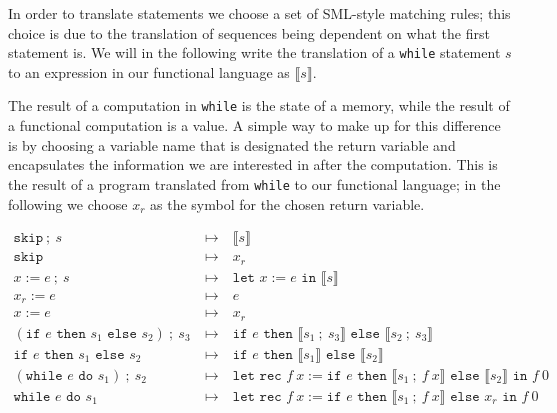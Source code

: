 \documentclass[11pt, leqno]{article}
\theoremstyle{definition}
\begin{document}
In order to translate statements we choose a set of SML-style matching rules; this
choice is due to the translation of sequences being dependent on what the first
statement is. We will in the following write the translation of a \texttt{while}
statement $s$ to an expression in our functional language as $\llbracket s
\rrbracket$. 

The result of a computation in \texttt{while} is the state of a memory, while the
result of a functional computation is a value. A simple way to make up for this
difference is by choosing a variable name that is designated the return variable and
encapsulates the information we are interested in after the computation. This is the
result of a program translated from \texttt{while} to our functional language; in the
following we choose $x_r$ as the symbol for the chosen return variable. 

\begin{align}
  \label{eq:transwhile}
  \texttt{skip}~;~s & ~\mapsto~ & \llbracket s \rrbracket\\
  \texttt{skip}     & ~\mapsto~ & x_r\\
  x := e~;~s        & ~\mapsto~ & \texttt{let } x := e \texttt{ in }\llbracket s \rrbracket\\
  x_r := e          & ~\mapsto~ & e \\
  x := e            & ~\mapsto~ & x_r \\
  (\texttt{if } e \texttt{ then } s_1 \texttt{ else } s_2) ~;~s_3
                    & ~\mapsto~ & \texttt{if } e
                                  \texttt{ then } \llbracket s_1 ~;~ s_3 \rrbracket
                                  \texttt{ else } \llbracket s_2 ~;~ s_3 \rrbracket \\
  \texttt{if } e \texttt{ then } s_1 \texttt{ else } s_2
                    & ~\mapsto~ & \texttt{if } e
                                  \texttt{ then } \llbracket s_1 \rrbracket
                                  \texttt{ else } \llbracket s_2 \rrbracket \\
  (\texttt{while } e \texttt{ do } s_1) ~;~ s_2
                    & ~\mapsto~ & \texttt{let rec } f~x :=
                                  \texttt{if } e
                                  \texttt{ then } \llbracket s_1 ~;~ f~x \rrbracket
                                  \texttt{ else } \llbracket s_2 \rrbracket \label{eq:while1}
                                  \texttt{ in } f~0\\
  \texttt{while } e \texttt{ do } s_1
                    & ~\mapsto~ & \texttt{let rec } f~x :=
                                  \texttt{if } e
                                  \texttt{ then } \llbracket s_1 ~;~ f~x \rrbracket
                                  \texttt{ else } x_r \label{eq:while2}
                                  \texttt{ in } f~0
\end{align}
\end{document}

